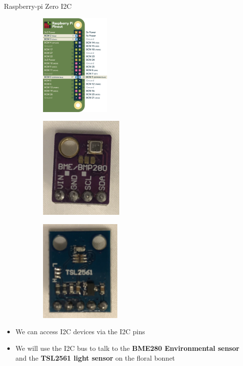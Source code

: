 \begin{frame}
   {Raspberry-pi Zero I2C}
   \begin{figure}[H]
      \centering
      \begin{subfigure}{0.3\textwidth}
         \centering
         \includegraphics[height=2in]{IMAGES/rpi-pins-i2c}
      \end{subfigure}
      \begin{subfigure}{0.3\textwidth}
         \centering
         \includegraphics[height=2in]{IMAGES/BME280}
      \end{subfigure}
      \begin{subfigure}{0.3\textwidth}
         \centering
         \includegraphics[height=2in]{IMAGES/TSL2561}
      \end{subfigure}
   \end{figure}
   \begin{itemize}
      \item We can access I2C devices via the I2C pins
      \item We will use the I2C bus to talk to the
	      \textbf{BME280 Environmental sensor}
	      and the \textbf{TSL2561 light sensor}
	      on the floral bonnet
   \end{itemize}
\end{frame}

\cprotect{}

